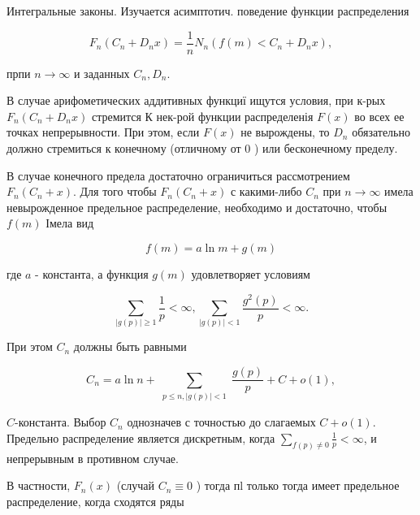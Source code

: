 \documentclass[10pt]{article}
\begin{document}
Интегральные законы. Изучается асимптотич. поведение функции распределения



\[

F_{n}\left(C_{n}+D_{n} x\right)=\frac{1}{n} N_{n}\left(f(m)<C_{n}+D_{n} x\right),

\]



прпи $n \longrightarrow \infty$ и заданных $C_{n}, D_{n}$.



В случае арифометических аддитивных функциї ищутся условия, при к-рых $F_{n}\left(C_{n}+D_{n} x\right)$ стремится К нек-рой функции распределенія $F(x)$ во всех ее точках непрерывности. При этом, если $F(x)$ не вырождены, то $D_{n}$ обязательно должно стремиться к конечному (отличному от 0 ) или бесконечному пределу.



В случае конечного предела достаточно ограничиться рассмотрением $F_{n}\left(C_{n}+x\right)$. Для того чтобы $F_{n}\left(C_{n}+x\right)$ с какими-либо $C_{n}$ при $n \longrightarrow \infty$ имела невырожденное предельное распределение, необходимо и достаточно, чтобы $f(m)$ Імела вид



\[

f(m)=a \ln m+g(m)

\]



где $a$ - константа, а функция $g(m)$ удовлетворяет условиям



\[

\sum_{|g(p)| \geqslant 1} \frac{1}{p}<\infty, \sum_{|g(p)|<1} \frac{g^{2}(p)}{p}<\infty .

\]



При этом $C_{n}$ должны быть равными



\[

C_{n}=a \ln n+\sum_{\substack{p \leqslant n,|g(p)|<1}} \frac{g(p)}{p}+C+o(1),

\]



$C$-константа. Выбор $C_{n}$ однозначев с точностью до слагаемых $C+o(1)$. Предельно распределение является дискретным, когда $\sum_{f(p) \neq 0} \frac{1}{p}<\infty$, и непрерывным в противном случае.



В частности, $F_{n}(x)$ (случай $C_{n} \equiv 0$ ) тогда пl только тогда имеет предельное распределение, когда сходятся ряды
\end{document}
